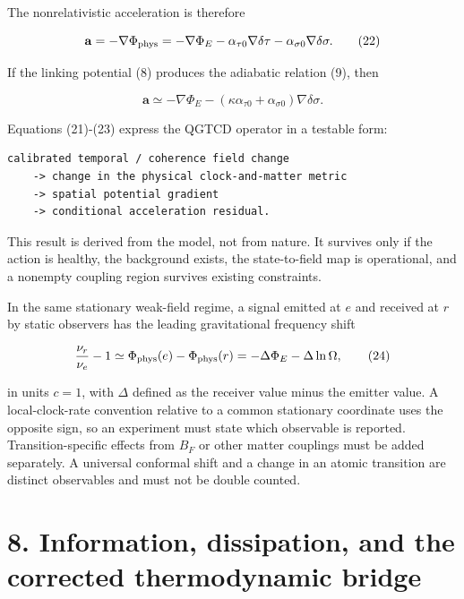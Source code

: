 \documentclass[
  american,
  11pt,
  letterpaper,
]{article}
\newcounter{none} %
\begin{document}
The nonrelativistic acceleration is therefore

\begin{equation}
\mathbf a=-\nabla\Phi_{\rm phys}
=-\nabla\Phi_E
-\alpha_{\tau0}\nabla\delta\tau
-\alpha_{\sigma0}\nabla\delta\sigma .
\tag{22}
\end{equation}

If the linking potential (8) produces the adiabatic relation (9), then

\begin{equation}
\mathbf a\simeq-\nabla\Phi_E
-\left(\kappa\alpha_{\tau0}+\alpha_{\sigma0}\right)
\nabla\delta\sigma .
\tag{23}
\end{equation}

Equations (21)-(23) express the QGTCD operator in a testable form:

\begin{verbatim}
calibrated temporal / coherence field change
    -> change in the physical clock-and-matter metric
    -> spatial potential gradient
    -> conditional acceleration residual.
\end{verbatim}

This result is derived from the model, not from nature. It survives only if the action is healthy, the background exists, the state-to-field map is operational, and a nonempty coupling region survives existing constraints.

In the same stationary weak-field regime, a signal emitted at \(e\) and received at \(r\) by static observers has the leading gravitational frequency shift

\begin{equation}
\frac{\nu_r}{\nu_e}-1
\simeq \Phi_{\rm phys}(e)-\Phi_{\rm phys}(r)
=-\Delta\Phi_E-\Delta\ln\Omega ,
\tag{24}
\end{equation}

in units \(c=1\), with \(\Delta\) defined as the receiver value minus the emitter value. A local-clock-rate convention relative to a common stationary coordinate uses the opposite sign, so an experiment must state which observable is reported. Transition-specific effects from \(B_F\) or other matter couplings must be added separately. A universal conformal shift and a change in an atomic transition are distinct observables and must not be double counted.

\section{8. Information, dissipation, and the corrected thermodynamic bridge}\label{information-dissipation-and-the-corrected-thermodynamic-bridge}
\end{document}
